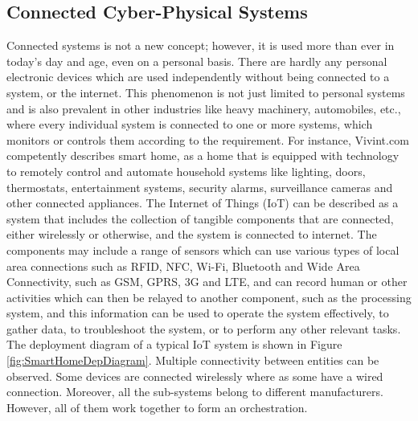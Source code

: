 \subsection{Connected Cyber-Physical Systems}

Connected systems is not a new concept; however, it is used more than ever in today’s day and age, even on a personal basis. There are hardly any personal electronic devices which are used independently without being connected to a system, or the internet. This phenomenon is not just limited to personal systems and is also prevalent in other industries like heavy machinery, automobiles, etc., where every individual system is connected to one or more systems, which monitors or controls them according to the requirement. For instance, Vivint.com \cite{Vivint.com} competently describes smart home, as a home that is equipped with technology to remotely control and automate household systems like lighting, doors, thermostats, entertainment systems, security alarms, surveillance cameras and other connected appliances. The Internet of Things (IoT) can be described as a system that includes the collection of tangible components that are connected, either wirelessly or otherwise, and the system is connected to internet. The components may include a range of sensors which can use various types of local area connections such as RFID, NFC, Wi-Fi, Bluetooth and Wide Area Connectivity, such as GSM, GPRS, 3G and LTE, and can record human or other activities which can then be relayed to another component, such as the processing system, and this information can be used to operate the system effectively, to gather data, to troubleshoot the system, or to perform any other relevant tasks\cite{LopezResearch2013}. The deployment diagram of a typical IoT system is shown in Figure \ref{fig:SmartHomeDepDiagram}. Multiple connectivity between entities can be observed. Some devices are connected wirelessly where as some have a wired connection. Moreover, all the sub-systems belong to different manufacturers. However, all of them work together to form an orchestration.

